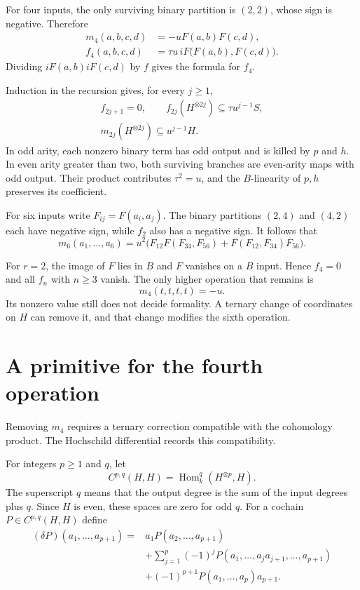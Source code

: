 For four inputs, the only surviving binary partition is $(2,2)$,
whose sign is negative. Therefore
\begin{equation}\label{eq:ha-m4}
 \begin{split}
 m_4(a,b,c,d)&=-uF(a,b)F(c,d),\\
 f_4(a,b,c,d)&=\tau u\,iF\bigl(F(a,b),F(c,d)\bigr).
 \end{split}
\end{equation}
Dividing $iF(a,b)iF(c,d)$ by $f$ gives the formula for $f_4$.

Induction in the recursion gives, for every $j\geq1$,
\[
 \begin{gathered}
 f_{2j+1}=0,\qquad
 f_{2j}(H^{\otimes2j})\subseteq\tau u^{j-1}S,\\
 m_{2j}(H^{\otimes2j})\subseteq u^{j-1}H.
 \end{gathered}
\]
In odd arity, each nonzero binary term has odd output and is killed
by $p$ and $h$.
In even arity greater than two, both surviving branches are
even-arity maps with odd output.
Their product contributes $\tau^2=u$, and the $B$-linearity of
$p,h$ preserves its coefficient.

For six inputs write $F_{ij}=F(a_i,a_j)$. The binary partitions
$(2,4)$ and $(4,2)$ each have negative sign, while $f_2$ also has
a negative sign. It follows that
\begin{equation}\label{eq:ha-m6}
 m_6(a_1,\ldots,a_6)
 =u^2\bigl(F_{12}F(F_{34},F_{56})
          +F(F_{12},F_{34})F_{56}\bigr).
\end{equation}

For $r=2$, the image of $F$ lies in $B$ and $F$ vanishes on a
$B$ input. Hence $f_4=0$ and all $f_n$ with $n\geq3$ vanish.
The only higher operation that remains is
\[
 m_4(t,t,t,t)=-u.
\]
Its nonzero value still does not decide formality.
A ternary change of coordinates on $H$ can remove it, and that
change modifies the sixth operation.

\section{A primitive for the fourth operation}
\label{sec:ha-hochschild}

Removing $m_4$ requires a ternary correction compatible with the
cohomology product. The Hochschild differential records this compatibility.

For integers $p\geq1$ and $q$, let
\[
 C^{p,q}(H,H)=\operatorname{Hom}_k^q(H^{\otimes p},H).
\]
The superscript $q$ means that the output degree is the sum of the
input degrees plus $q$. Since $H$ is even, these spaces are zero for
odd $q$. For a cochain $P\in C^{p,q}(H,H)$ define
\begin{equation}\label{eq:ha-hochschild-differential}
 \begin{split}
 (\delta P)(a_1,\ldots,a_{p+1})
 ={}&a_1P(a_2,\ldots,a_{p+1})\\
 &+\sum_{j=1}^{p}(-1)^j
 P(a_1,\ldots,a_ja_{j+1},\ldots,a_{p+1})\\
 &+(-1)^{p+1}P(a_1,\ldots,a_p)a_{p+1}.
 \end{split}
\end{equation}

